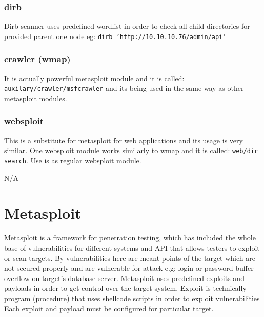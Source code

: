 \documentclass{article}[12pt]
\begin{document}
\subsubsection{dirb}

Dirb scanner uses predefined wordlist in order to check all child directories for provided parent one node eg:
\newline
\texttt{dirb 'http://10.10.10.76/admin/api'}

\subsubsection{crawler (wmap)}
It is actually powerful metasploit module and it is called: \texttt{auxilary/crawler/msfcrawler} and its being used in the same way as other metasploit modules.

\subsubsection{websploit}

This is a substitute for metasploit for web applications and its usage is very similar. One websploit module works similarly to wmap and it is called: \texttt{web/dir search}. Use is as regular websploit module.








N/A



\section{Metasploit}
Metasploit is a framework for penetration testing, which has included the whole base of vulnerabilities for different systems and API that allows testers to exploit or scan targets.
By vulnerabilities here are meant points of the target which are not secured properly and are vulnerable for attack e.g:
login or password buffer overflow on target's database server. Metasploit uses predefined exploits and payloads in order to get control over the target system.
Exploit is technically program (procedure) that uses shellcode scripts in order to exploit vulnerabilities Each exploit and payload must be configured for particular target.
\end{document}
